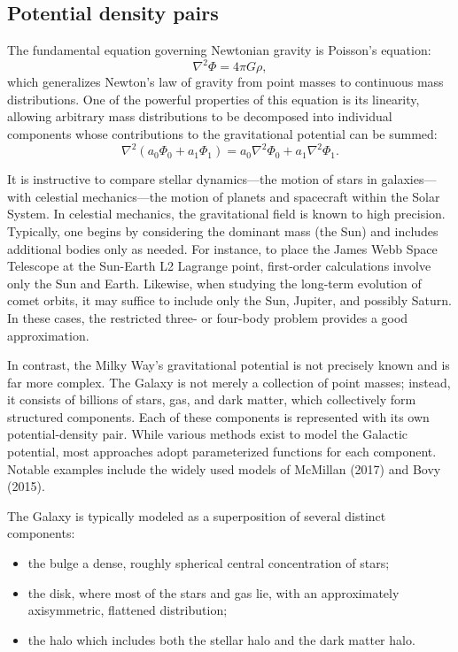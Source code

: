     \subsection{Potential density pairs}
        The fundamental equation governing Newtonian gravity is Poisson's equation:
        \begin{equation}
            \nabla^2 \Phi = 4\pi G \rho,
        \end{equation}
        which generalizes Newton's law of gravity from point masses to continuous mass distributions. One of the powerful properties of this equation is its linearity, allowing arbitrary mass distributions to be decomposed into individual components whose contributions to the gravitational potential can be summed:
        \begin{equation}
            \nabla^2 \left(a_0\Phi_0 + a_1\Phi_1 \right) = a_0 \nabla^2 \Phi_0 + a_1 \nabla^2 \Phi_1.
        \end{equation}

        It is instructive to compare stellar dynamics—the motion of stars in galaxies—with celestial mechanics—the motion of planets and spacecraft within the Solar System. In celestial mechanics, the gravitational field is known to high precision. Typically, one begins by considering the dominant mass (the Sun) and includes additional bodies only as needed. For instance, to place the James Webb Space Telescope at the Sun-Earth L2 Lagrange point, first-order calculations involve only the Sun and Earth. Likewise, when studying the long-term evolution of comet orbits, it may suffice to include only the Sun, Jupiter, and possibly Saturn. In these cases, the restricted three- or four-body problem provides a good approximation.

        In contrast, the Milky Way's gravitational potential is not precisely known and is far more complex. The Galaxy is not merely a collection of point masses; instead, it consists of billions of stars, gas, and dark matter, which collectively form structured components. Each of these components is represented with its own potential-density pair. While various methods exist to model the Galactic potential, most approaches adopt parameterized functions for each component. Notable examples include the widely used models of McMillan (2017) and Bovy (2015).

        The Galaxy is typically modeled as a superposition of several distinct components:

        \begin{itemize}
            \item the bulge a dense, roughly spherical central concentration of stars;
            \item the disk, where most of the stars and gas lie, with an approximately axisymmetric, flattened distribution;
            \item the halo which includes both the stellar halo and the dark matter halo.
        \end{itemize}

